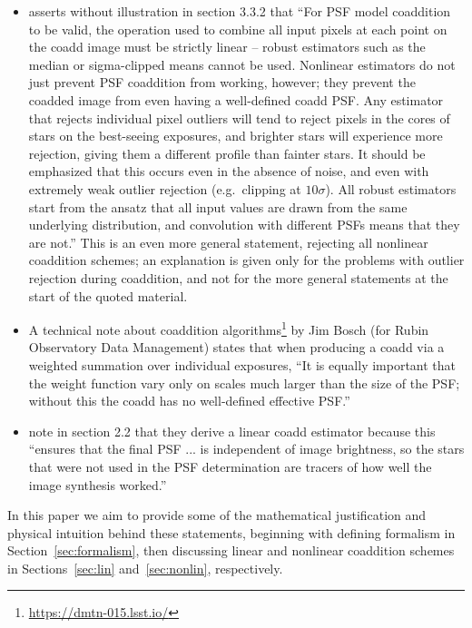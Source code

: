 \documentclass{aastex63}
\begin{document}
\begin{itemize}
\item \citet{2018PASJ...70S...5B} asserts without illustration in section 3.3.2 that ``For PSF model coaddition to be valid, the operation used to
combine all input pixels at each point on the coadd image must
be strictly linear –{} robust estimators such as the median or
sigma-clipped means cannot be used. Nonlinear estimators do
not just prevent PSF coaddition from working, however; they
prevent the coadded image from even having a well-defined coadd PSF. Any estimator that rejects individual pixel outliers will tend to reject pixels in the cores of stars on the best-seeing exposures, and brighter stars will experience more rejection, giving
them a different profile than fainter stars. It should be emphasized that this occurs even in the absence of noise, and even
with extremely weak outlier rejection (e.g.\ clipping at $10\sigma$). All
robust estimators start from the ansatz that all input values are
drawn from the same underlying distribution, and convolution
with different PSFs means that they are not.''   This is an even more general statement, rejecting all nonlinear coaddition schemes; an explanation is given only for the problems with outlier rejection during coaddition, and not for the more general statements at the start of the quoted material. 

\item A technical note about coaddition algorithms\footnote{\url{https://dmtn-015.lsst.io/}} by Jim Bosch (for Rubin Observatory Data Management) states that when producing a coadd via a weighted summation over individual exposures, ``It is equally important that the weight function vary only on scales much larger than the size of the PSF; without this the coadd has no well-defined effective PSF.''

\item \citet{2011ApJ...741...46R} note in section 2.2 that they derive a linear coadd estimator because this ``ensures that the final PSF ... is independent of image brightness, so the stars that were not used in the PSF determination are tracers of how well the image synthesis worked.''

\end{itemize}

In this paper we aim to provide some of the mathematical justification and physical intuition behind these statements, beginning with defining formalism in Section~\ref{sec:formalism}, then discussing linear and nonlinear coaddition schemes in Sections~\ref{sec:lin} and~\ref{sec:nonlin}, respectively.
\end{document}
